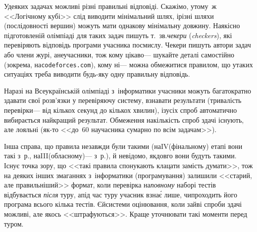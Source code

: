 \documentclass[14pt,a4paper]{extarticle}
\begin{document}
У\nolinebreak[3] деяких задачах можливі різні правильні відповіді. Скажімо, у\nolinebreak[3] тому~ж <<Логічному кубі>> слід виводити мінімальний шлях, і\nolinebreak[3] різні шляхи (послідовності вершин) можуть мати однакову мінімальну довжину. На\nolinebreak[3] якісно підготовленій олімпіаді для таких задач пишуть т.~зв.\nolinebreak[1] \emph{чекери} (\emph{checkers}), які перевіряють відповідь програми учасника по\nolinebreak[3] смислу. Чекери пишуть автори задач або члени журі, а\nolinebreak[3] не\nolinebreak[3] учасники, тож кому цікаво\nolinebreak[3] --- шукайте деталі самостійно (зокрема, на\nolinebreak[1] \verb"codeforces.com"), кому ні\nolinebreak[3] --- можна обмежитися правилом, що у\nolinebreak[3] таких ситуаціях треба виводити будь-яку одну правильну відповідь.

 Наразі на Всеукраїнській олімпіаді з~інформатики учасники можуть багатократно здавати свої розв'язки у перевіряючу систему, взнавати результати (тривалість перевірки\nolinebreak[3] --- від кількох секунд до кількох хвилин), і\nolinebreak[2] з\nolinebreak[3] усіх спроб автоматично вибирається найкращий результат. Обмеження на\nolinebreak[3] кількість спроб здачі існують, але лояльні (як-то <<до~60 на\nolinebreak[3] учасника сумарно по всім задачам>>). 

Інша справа, що правила не\nolinebreak[3] завжди були такими (на\nolinebreak[2] IV\nolinebreak[3] (фінальному) етапі вони такі з~р., на\nolinebreak[2] III\nolinebreak[3] (обласному)\nolinebreak[3] --- з~р.), й невідомо, як\nolinebreak[3] довго вони будуть такими. Існує точка зору, що <<такі правила спонукають клацати замість думати>>, тож на деяких інших змаганнях з~інформатики (програмування) залишили <<старий, але правильніший>> формат, коли перевірка на\nolinebreak[2] \emph{повному} наборі тестів відбувається \emph{після} туру, а\nolinebreak[3] під час туру учасник взна\'{є} лише, чи\nolinebreak[3] проходить його програма всього кілька тестів. Є\nolinebreak[3] й\nolinebreak[3] системи оцінювання, коли зайві спроби здачі можливі, але якось <<штрафуються>>. Краще уточнювати такі моменти перед туром.
\end{document}
